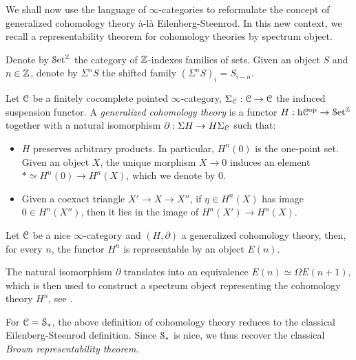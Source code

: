 \documentclass[10pt]{amsart}
\numberwithin{equation}{section}
\begin{document}
We shall now use the language of $\infty$-categories to reformulate the concept of generalized cohomology theory \` a-l\`a Eilenberg-Steenrod. In this new context, we recall a representability theorem for cohomology theories by spectrum object. 
\begin{remark}
  Denote by $\mathcal{S}\mathrm{et}^{\mathbb{Z}}$ the category of $\mathbb{Z}$-indexes families of sets. Given an object $S$ and $n\in\mathbb{Z}$, denote by $\Sigma^n S$ the shifted family $(\Sigma^nS)_i=S_{i-n}$.  
\end{remark}
\begin{definition}\label{def:cohthe}
  Let $\mathcal{C}$ be a finitely cocomplete pointed $\infty$-category, $\Sigma_{\mathcal{C}}:\mathcal{C} \to \mathcal{C}$ the induced suspension functor. A \emph{generalized cohomology theory} is a functor $H:\mathrm{h}\mathcal{C}^{\mathrm{op}}\to\mathcal{S}\mathrm{et}^{\mathbb{Z}}$ together with a natural isomorphism $\partial:\Sigma H\to H\Sigma_{\mathcal{C}}$ such that:
  \begin{itemize}
    \item $H$ preserves arbitrary products. In particular, $H^n(0)$ is the one-point set. Given an object $X$, the unique morphism $X\to0$ induces an element $*\simeq H^n(0)\to H^n(X)$, which we denote by $0$. 
    \item Given a coexact triangle $X'\to X\to X''$, if $\eta\in H^n(X)$ has image $0\in H^n(X'')$, then it lies in the image of $H^n(X')\to H^n(X)$. 
  \end{itemize}
\end{definition}
\begin{theorem}
 Let $\mathcal{C}$ be a nice $\infty$-category and $(H,\partial)$ a generalized cohomology theory, then, for every $n$, the functor $H^n$ is representable by an object $E(n)$. 
\end{theorem}
The natural isomorphism $\partial$ translates into an equivalence $E(n)\simeq\Omega E(n+1)$, which is then used to construct a spectrum object representing the cohomology theory $H^n$, see \cite[1.4.1.11]{lurie2017ha}.
\begin{remark}
  For $\mathcal{C}=\mathcal{S}_*$, the above definition of cohomology theory reduces to the classical Eilenberg-Steenrod definition. Since $\mathcal{S}_*$ is nice, we thus recover the classical \emph{Brown representability theorem}. 
\end{remark}

{\footnotesize


}
\end{document}
